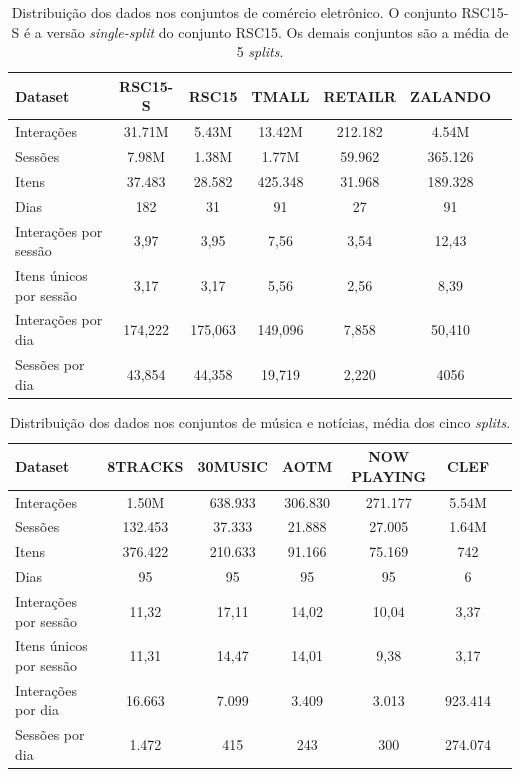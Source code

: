   \begin{table}[htbp]
    \centering
    \begin{tabular}{lcccccc}
        \toprule
        \textbf{Dataset} & \textbf{RSC15-S} & \textbf{RSC15} & \textbf{TMALL} & \textbf{RETAILR} & \textbf{ZALANDO} \\
        \midrule
        Interações & 31.71M & 5.43M & 13.42M & 212.182 & 4.54M \\
        Sessões & 7.98M & 1.38M & 1.77M & 59.962 & 365.126 \\
        Itens & 37.483 & 28.582 & 425.348 & 31.968 & 189.328 \\
        Dias & 182 & 31 & 91 & 27 & 91 \\
        \hline
        Interações por sessão & 3,97 & 3,95 & 7,56 & 3,54 & 12,43 \\ 
        Itens únicos por sessão & 3,17 & 3,17 & 5,56 & 2,56 & 8,39 \\ 
        Interações por dia & 174,222 & 175,063 & 149,096 & 7,858 & 50,410 \\
        Sessões por dia & 43,854 & 44,358 & 19,719 & 2,220 & 4056 \\ 
        \bottomrule
    \end{tabular}
    \caption{Distribuição dos dados nos conjuntos de comércio eletrônico. O
    conjunto RSC15-S é a versão \textit{single-split} do conjunto RSC15. Os demais
    conjuntos são a média de 5 \textit{splits}. }
    \label{tab:datasets}
  \end{table}
  
  \begin{table}
    \centering
    \begin{tabular}{lcccccc}
        \toprule
        \textbf{Dataset} & \textbf{8TRACKS} & \textbf{30MUSIC} & \textbf{AOTM} & \textbf{NOW PLAYING} & \textbf{CLEF} \\
        \midrule
        Interações & 1.50M & 638.933 & 306.830 & 271.177 & 5.54M \\
        Sessões & 132.453 & 37.333 & 21.888 & 27.005 & 1.64M \\
        Itens & 376.422 & 210.633 & 91.166 & 75.169 & 742 \\
        Dias & 95 & 95 & 95 & 95 & 6 \\
        \hline
        Interações por sessão & 11,32 & 17,11 & 14,02 & 10,04 & 3,37 \\
        Itens únicos por sessão & 11,31 & 14,47 & 14,01 & 9,38 & 3,17 \\
        Interações por dia & 16.663 & 7.099 & 3.409 & 3.013 & 923.414 \\
        Sessões por dia & 1.472 & 415 & 243 & 300 & 274.074 \\
        \bottomrule
    \end{tabular}
    \caption{Distribuição dos dados nos conjuntos de música e notícias, média dos cinco \textit{splits}.}
    \label{tab:datasets_comparison}
  \end{table}
  
